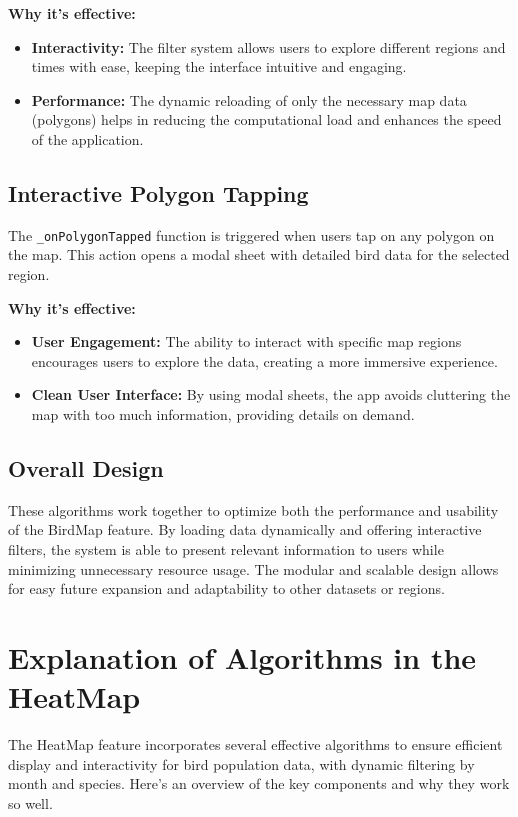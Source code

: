 \documentclass[a4paper]{article}
\begin{document}
\textbf{Why it's effective:}
\begin{itemize}
    \item \textbf{Interactivity:} The filter system allows users to explore different regions and times with ease, keeping the interface intuitive and engaging.
    \item \textbf{Performance:} The dynamic reloading of only the necessary map data (polygons) helps in reducing the computational load and enhances the speed of the application.
\end{itemize}

\subsection{Interactive Polygon Tapping}
The \texttt{\_onPolygonTapped} function is triggered when users tap on any polygon on the map. This action opens a modal sheet with detailed bird data for the selected region.

\textbf{Why it's effective:}
\begin{itemize}
    \item \textbf{User Engagement:} The ability to interact with specific map regions encourages users to explore the data, creating a more immersive experience.
    \item \textbf{Clean User Interface:} By using modal sheets, the app avoids cluttering the map with too much information, providing details on demand.
\end{itemize}

\subsection{Overall Design}
These algorithms work together to optimize both the performance and usability of the BirdMap feature. By loading data dynamically and offering interactive filters, the system is able to present relevant information to users while minimizing unnecessary resource usage. The modular and scalable design allows for easy future expansion and adaptability to other datasets or regions.

\section{Explanation of Algorithms in the HeatMap}

The HeatMap feature incorporates several effective algorithms to ensure efficient display and interactivity for bird population data, with dynamic filtering by month and species. Here's an overview of the key components and why they work so well.
\end{document}
